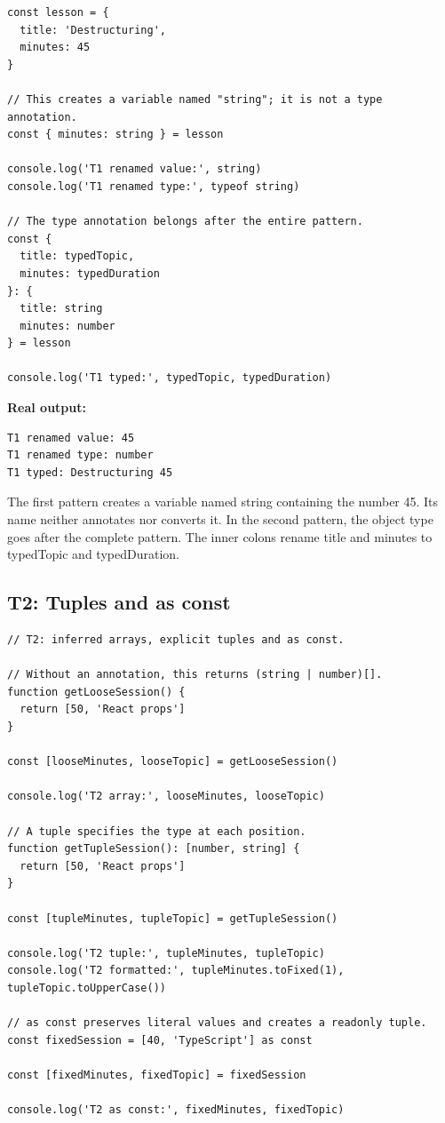 \documentclass[10pt,a4paper]{article}
\begin{document}
\begin{lstlisting}[language=GuideJS]
const lesson = {
  title: 'Destructuring',
  minutes: 45
}

// This creates a variable named "string"; it is not a type annotation.
const { minutes: string } = lesson

console.log('T1 renamed value:', string)
console.log('T1 renamed type:', typeof string)

// The type annotation belongs after the entire pattern.
const {
  title: typedTopic,
  minutes: typedDuration
}: {
  title: string
  minutes: number
} = lesson

console.log('T1 typed:', typedTopic, typedDuration)
\end{lstlisting}


\textbf{Real output:}

\begin{lstlisting}[language={}]
T1 renamed value: 45
T1 renamed type: number
T1 typed: Destructuring 45
\end{lstlisting}

The first pattern creates a variable named string containing the number 45. Its name neither annotates nor converts it. In the second pattern, the object type goes after the complete pattern. The inner colons rename title and minutes to typedTopic and typedDuration.

\subsection{T2: Tuples and as const}

\begin{lstlisting}[language=GuideJS]
// T2: inferred arrays, explicit tuples and as const.

// Without an annotation, this returns (string | number)[].
function getLooseSession() {
  return [50, 'React props']
}

const [looseMinutes, looseTopic] = getLooseSession()

console.log('T2 array:', looseMinutes, looseTopic)

// A tuple specifies the type at each position.
function getTupleSession(): [number, string] {
  return [50, 'React props']
}

const [tupleMinutes, tupleTopic] = getTupleSession()

console.log('T2 tuple:', tupleMinutes, tupleTopic)
console.log('T2 formatted:', tupleMinutes.toFixed(1), tupleTopic.toUpperCase())

// as const preserves literal values and creates a readonly tuple.
const fixedSession = [40, 'TypeScript'] as const

const [fixedMinutes, fixedTopic] = fixedSession

console.log('T2 as const:', fixedMinutes, fixedTopic)
\end{lstlisting}
\end{document}
